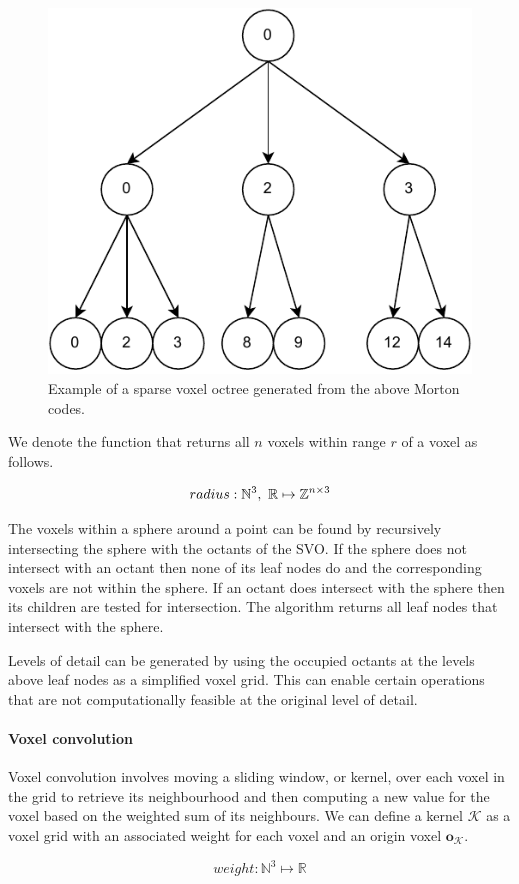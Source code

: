\begin{figure}[h]
    \centering
    \includegraphics*[width=.5\textwidth]{./fig/svo.pdf}
    \caption{Example of a sparse voxel octree generated from the above Morton codes.}
    \label{fig:vg_svo}
\end{figure}

We denote the function that returns all \(n\) voxels within range \(r\) of a voxel as follows.

\begin{equation}
    radius: \mathbb{N}^{3},\ \mathbb{R} \mapsto \mathbb{Z}^{n \times 3}
\end{equation}

The voxels within a sphere around a point can be found by recursively intersecting the sphere with the octants of the SVO. If the sphere does not intersect with an octant then none of its leaf nodes do and the corresponding voxels are not within the sphere. If an octant does intersect with the sphere then its children are tested for intersection. The algorithm returns all leaf nodes that intersect with the sphere.

Levels of detail can be generated by using the occupied octants at the levels above leaf nodes as a simplified voxel grid. This can enable certain operations that are not computationally feasible at the original level of detail.

\paragraph{Voxel convolution}
Voxel convolution involves moving a sliding window, or kernel, over each voxel in the grid to retrieve its neighbourhood and then computing a new value for the voxel based on the weighted sum of its neighbours. We can define a kernel \(\mathcal{K}\) as a voxel grid with an associated weight for each voxel and an origin voxel \(\boldsymbol{o}_{\mathcal{K}}\).

\begin{equation}
weight: \mathbb{N}^{3} \mapsto \mathbb{R}
\end{equation}

